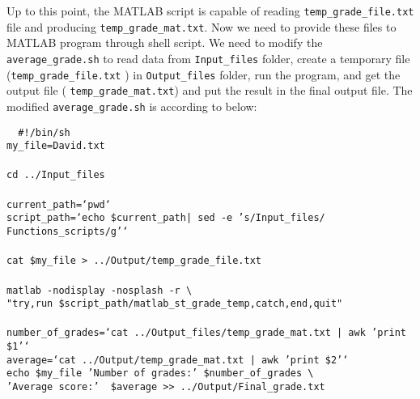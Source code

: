 Up to this point, the MATLAB script is capable of reading \texttt{temp\_grade\_file.txt} file and producing \texttt{temp\_grade\_mat.txt}. Now we need to provide these files to MATLAB program through shell script. We need to modify the \texttt{average\_grade.sh} to read data from \texttt{Input\_files} folder, create a temporary file (\texttt{temp\_grade\_file.txt} ) in \texttt{Output\_files} folder, run the program, and get the output file ( \texttt{temp\_grade\_mat.txt}) and put the result in the final output file. The modified \texttt{average\_grade.sh} is according to below:\\
\vspace{5mm}
 \begin{mdframed}[hidealllines=true,backgroundcolor=gray!20]
 \begin{singlespace}
 \fontsize{10pt}{1pt}
\texttt{
\noindent
{ \color{matlab_green} \#!/bin/sh} \\
my\_file=David.txt\\
\\
cd ../Input\_files\\ 
\\
current\_path={\color{red}`pwd`}\\
script\_path={\color{red}`echo \$current\_path| sed -e 's/Input\_files/ Functions\_scripts/g'`}\\
\\
cat \$my\_file > ../Output/temp\_grade\_file.txt\\
\\
matlab -nodisplay -nosplash -r   \textbackslash \\
{\color{red}"try,run \$script\_path/matlab\_st\_grade\_temp,catch,end,quit"}\\
\\
number\_of\_grades={\color{red}`cat ../Output\_files/temp\_grade\_mat.txt | awk '{print \$1}'`}\\
average={\color{red}`cat ../Output/temp\_grade\_mat.txt | awk '{print \$2}'`}\\
echo \$my\_file {\color{red}'Number of grades:'}  \$number\_of\_grades \textbackslash \\
\phantom{x}\hspace{14ex} {\color{red}'Average score:'} \  \$average >> ../Output/Final\_grade.txt
 }
 \end{singlespace}
\end{mdframed}
\vspace{5mm}
\noindent
